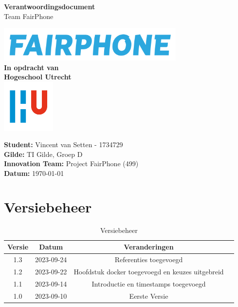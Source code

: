 \documentclass[a4paper]{report}
\begin{document}
\begin{titlepage}
  \begin{center}
      \vspace*{.9cm}
      \Huge
      \textbf{ Verantwoordingsdocument }\\
      \vspace{0.2cm}
      \small Team FairPhone

      \normalsize


      \vspace{2cm}
      \includegraphics[width=0.7\textwidth]{Images/fairphone.png}
      \vspace{2cm}
      \Large\\
      \textbf{In opdracht van}\\
      \large
      \textbf{Hogeschool Utrecht} \\
      \includegraphics[width=0.2\textwidth]{Images/logouni.png}


      \vfill
    \end{center}
      \textbf{Student:} Vincent van Setten - 1734729 \\
      \textbf{Gilde:} TI Gilde, Groep D\\
      \textbf{Innovation Team:} Project FairPhone (499) \\
      \textbf{Datum:} \today \\
      \vspace{2cm}
\end{titlepage}



\tableofcontents

\chapter{Versiebeheer}
\begin{table}[h]
    \centering
    \begin{tabular}{|c|c|c|p{5cm}|}
        \hline
        \textbf{Versie} & \textbf{Datum} & \textbf{Veranderingen}  \\
        \hline
        1.3    & 2023-09-24 & Referenties toegevoegd \\
        \hline
        1.2    & 2023-09-22 & Hoofdstuk docker toegevoegd en keuzes uitgebreid \\
        \hline
        1.1    & 2023-09-14 & Introductie en timestamps toegevoegd\\
        \hline
        1.0    & 2023-09-10 & Eerste Versie \\
        \hline
    \end{tabular}
    \caption{Versiebeheer}
\end{table}
\end{document}
